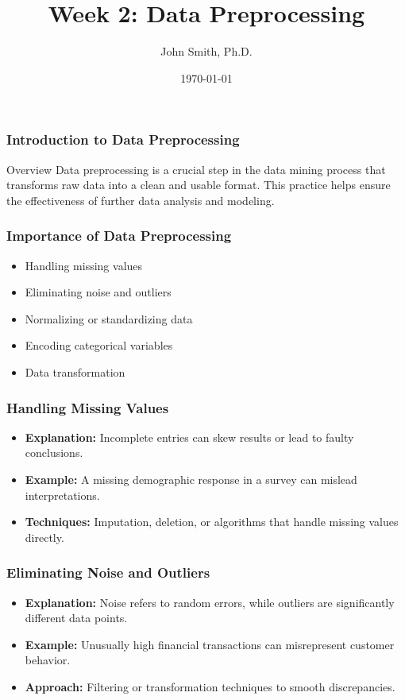 \documentclass[aspectratio=169]{beamer}
\title[Week 2: Data Preprocessing]{Week 2: Data Preprocessing}
\author[J. Smith]{John Smith, Ph.D.}
\institute[University Name]{
  Department of Computer Science\\
  University Name\\
  \vspace{0.3cm}
  Email: email@university.edu\\
  Website: www.university.edu
}
\date{\today}
\begin{document}
\frame{\titlepage}

\begin{frame}[fragile]
    \titlepage
\end{frame}

\begin{frame}[fragile]
    \frametitle{Introduction to Data Preprocessing}
    \begin{block}{Overview}
        Data preprocessing is a crucial step in the data mining process that transforms raw data into a clean and usable format. This practice helps ensure the effectiveness of further data analysis and modeling.
    \end{block}
\end{frame}

\begin{frame}[fragile]
    \frametitle{Importance of Data Preprocessing}
    \begin{itemize}
        \item Handling missing values
        \item Eliminating noise and outliers
        \item Normalizing or standardizing data
        \item Encoding categorical variables
        \item Data transformation
    \end{itemize}
\end{frame}

\begin{frame}[fragile]
    \frametitle{Handling Missing Values}
    \begin{itemize}
        \item \textbf{Explanation:} Incomplete entries can skew results or lead to faulty conclusions.
        \item \textbf{Example:} A missing demographic response in a survey can mislead interpretations.
        \item \textbf{Techniques:} Imputation, deletion, or algorithms that handle missing values directly.
    \end{itemize}
\end{frame}

\begin{frame}[fragile]
    \frametitle{Eliminating Noise and Outliers}
    \begin{itemize}
        \item \textbf{Explanation:} Noise refers to random errors, while outliers are significantly different data points.
        \item \textbf{Example:} Unusually high financial transactions can misrepresent customer behavior.
        \item \textbf{Approach:} Filtering or transformation techniques to smooth discrepancies.
    \end{itemize}
\end{frame}
\end{document}
